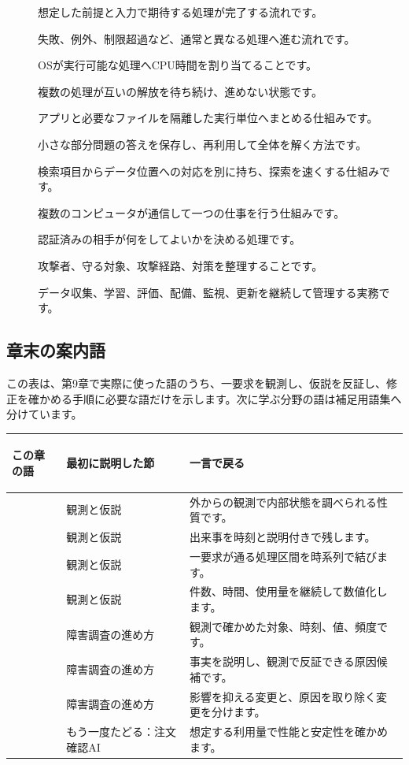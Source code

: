 {\begin{description}
  \item[] 想定した前提と入力で期待する処理が完了する流れです。
  \item[] 失敗、例外、制限超過など、通常と異なる処理へ進む流れです。
  \item[] OSが実行可能な処理へCPU時間を割り当てることです。
  \item[] 複数の処理が互いの解放を待ち続け、進めない状態です。
  \item[] アプリと必要なファイルを隔離した実行単位へまとめる仕組みです。
  \item[] 小さな部分問題の答えを保存し、再利用して全体を解く方法です。
  \item[] 検索項目からデータ位置への対応を別に持ち、探索を速くする仕組みです。
  \item[] 複数のコンピュータが通信して一つの仕事を行う仕組みです。
  \item[] 認証済みの相手が何をしてよいかを決める処理です。
  \item[] 攻撃者、守る対象、攻撃経路、対策を整理することです。
  \item[] データ収集、学習、評価、配備、監視、更新を継続して管理する実務です。
\end{description}%
}

\subsection*{章末の案内語}

この表は、第9章で実際に使った語のうち、一要求を観測し、仮説を反証し、修正を確かめる手順に必要な語だけを示します。次に学ぶ分野の語は補足用語集へ分けています。

\noindent\begin{tabularx}{\linewidth}{@{}>{\bfseries\raggedright\arraybackslash{}}p{32mm}>{\raggedright\arraybackslash}p{35mm}Y@{}}
  \toprule
  この章の語 & 最初に説明した節 & 一言で戻る \\
  \midrule
   & 観測と仮説 & 外からの観測で内部状態を調べられる性質です。 \\
   & 観測と仮説 & 出来事を時刻と説明付きで残します。 \\
   & 観測と仮説 & 一要求が通る処理区間を時系列で結びます。 \\
   & 観測と仮説 & 件数、時間、使用量を継続して数値化します。 \\
   & 障害調査の進め方 & 観測で確かめた対象、時刻、値、頻度です。 \\
   & 障害調査の進め方 & 事実を説明し、観測で反証できる原因候補です。 \\
   & 障害調査の進め方 & 影響を抑える変更と、原因を取り除く変更を分けます。 \\
   & もう一度たどる：注文確認AI & 想定する利用量で性能と安定性を確かめます。 \\
  \bottomrule
\end{tabularx}
